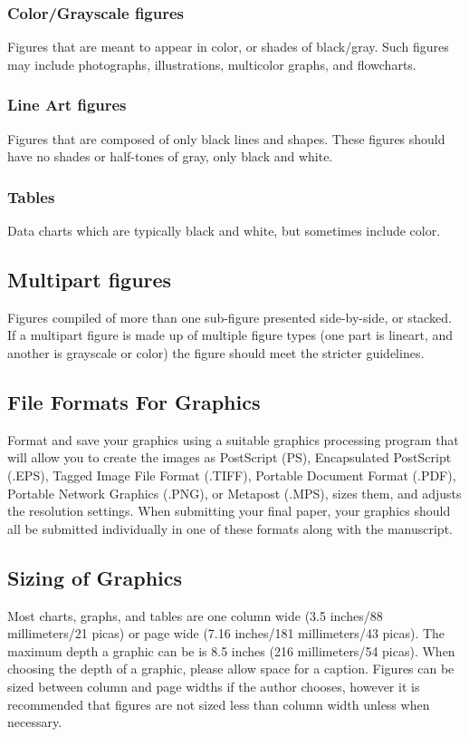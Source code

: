 \subsubsection{Color/Grayscale figures}
{Figures that are meant to appear in color, or shades of black/gray. Such 
figures may include photographs, illustrations, multicolor graphs, and 
flowcharts.}

\subsubsection{Line Art figures}
{Figures that are composed of only black lines and shapes. These figures 
should have no shades or half-tones of gray, only black and white.}

\subsubsection{Tables}
{Data charts which are typically black and white, but sometimes include 
color.}



\subsection{Multipart figures}
Figures compiled of more than one sub-figure presented side-by-side, or 
stacked. If a multipart figure is made up of multiple figure
types (one part is lineart, and another is grayscale or color) the figure 
should meet the stricter guidelines.

\subsection{File Formats For Graphics}\label{formats}
Format and save your graphics using a suitable graphics processing program 
that will allow you to create the images as PostScript (PS), Encapsulated 
PostScript (.EPS), Tagged Image File Format (.TIFF), Portable Document 
Format (.PDF), Portable Network Graphics (.PNG), or Metapost (.MPS), sizes them, and adjusts 
the resolution settings. When 
submitting your final paper, your graphics should all be submitted 
individually in one of these formats along with the manuscript.

\subsection{Sizing of Graphics}
Most charts, graphs, and tables are one column wide (3.5 inches/88 
millimeters/21 picas) or page wide (7.16 inches/181 millimeters/43 
picas). The maximum depth a graphic can be is 8.5 inches (216 millimeters/54
picas). When choosing the depth of a graphic, please allow space for a 
caption. Figures can be sized between column and page widths if the author 
chooses, however it is recommended that figures are not sized less than 
column width unless when necessary. 

